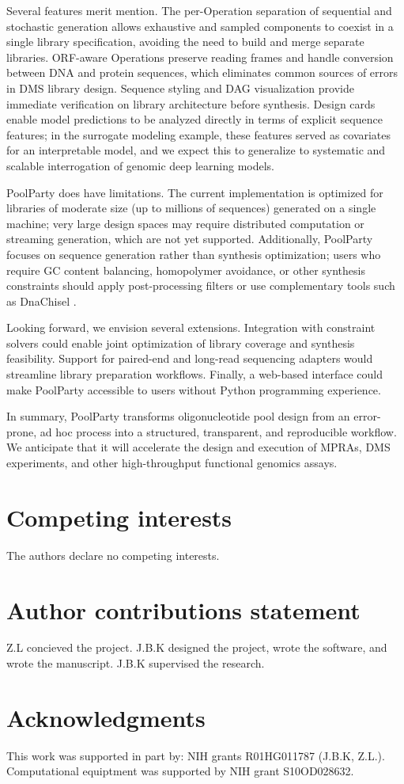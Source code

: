 \documentclass[unnumsec,webpdf,modern,large]{mam-authoring-template}%
\theoremstyle{thmstyleone}%
\theoremstyle{thmstyletwo}%
\theoremstyle{thmstylethree}%
\begin{document}
Several features merit mention. The per-Operation separation of sequential and stochastic generation allows exhaustive and sampled components to coexist in a single library specification, avoiding the need to build and merge separate libraries. ORF-aware Operations preserve reading frames and handle conversion between DNA and protein sequences, which eliminates common sources of errors in DMS library design. Sequence styling and DAG visualization provide immediate verification on library architecture before synthesis. Design cards enable model predictions to be analyzed directly in terms of explicit sequence features; in the surrogate modeling example, these features served as covariates for an interpretable model, and we expect this to generalize to systematic and scalable interrogation of genomic deep learning models.

PoolParty does have limitations. The current implementation is optimized for libraries of moderate size (up to millions of sequences) generated on a single machine; very large design spaces may require distributed computation or streaming generation, which are not yet supported. Additionally, PoolParty focuses on sequence generation rather than synthesis optimization; users who require GC content balancing, homopolymer avoidance, or other synthesis constraints should apply post-processing filters or use complementary tools such as DnaChisel \citep{Zulkower2020jk}.

Looking forward, we envision several extensions. Integration with constraint solvers could enable joint optimization of library coverage and synthesis feasibility. Support for paired-end and long-read sequencing adapters would streamline library preparation workflows. Finally, a web-based interface could make PoolParty accessible to users without Python programming experience.

In summary, PoolParty transforms oligonucleotide pool design from an error-prone, ad hoc process into a structured, transparent, and reproducible workflow. We anticipate that it will accelerate the design and execution of MPRAs, DMS experiments, and other high-throughput functional genomics assays.

\section{Competing interests}
The authors declare no competing interests. 

\section{Author contributions statement}
Z.L concieved the project. J.B.K designed the project, wrote the software, and wrote the manuscript. J.B.K supervised the research. 

\section{Acknowledgments}
This work was supported in part by: NIH grants R01HG011787 (J.B.K, Z.L.). Computational equiptment was supported by NIH grant S10OD028632.


\end{document}

